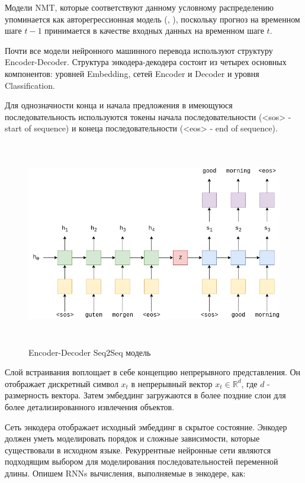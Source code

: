     Модели NMT, которые соответствуют данному условному распределению упоминается как авторегрессионная модель (\cite{3}, \cite{5}), поскольку прогноз на временном шаге $t - 1$ принимается в качестве входных данных на временном шаге $t$.
    
    Почти все модели нейронного машинного перевода используют структуру Encoder-Decoder. Структура энкодера-декодера состоит из четырех основных компонентов: уровней Embedding, сетей Encoder и Decoder и уровня Classification.
    
    Для однозначности конца и начала предложения в имеющуюся последовательность используются токены начала последовательности (<sos> - start of sequence) и конеца последовательности (<eos> - end of sequence). 
    
    \begin{figure}[ht!]
		\centering
		\captionsetup{justification=centering}
		\includegraphics[height=90mm]{img/encoder-decoder-img-1.png}
		\caption{Encoder-Decoder Seq2Seq модель}
	\end{figure}
	
	Слой встраивания воплощает в себе концепцию непрерывного представления. Он отображает дискретный символ $x_t$ в непрерывный вектор $x_t \in \mathbb{R}^d$, где $d$ - размерность вектора. Затем эмбеддинг загружаются в более поздние слои для более детализированного извлечения объектов.
	
	Сеть энкодера отображает исходный эмбеддинг в скрытое состояние. Энкодер должен уметь моделировать порядок и сложные зависимости, которые существовали в исходном языке. Рекуррентные нейронные сети являются подходящим выбором для моделирования последовательностей переменной длины. Опишем RNNs вычисления, выполняемые в энкодере, как:
	
